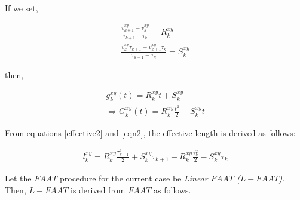 \documentclass[conference]{IEEEtran}
\begin{document}
If we set, 

\begin{eqnarray}
&\frac{v_{k+1}^{xy}-v_k^{xy}}{\tau_{k+1}-\tau_k}=R_k^{xy}&\\
&\frac{v_{k}^{xy}\tau_{k+1}-v_{k+1}^{xy}\tau_{k}}{\tau_{k+1}-\tau_k}=S_k^{xy}&
\end{eqnarray}

then, 

\begin{eqnarray}
&g_k^{xy}(t)=R_k^{xy}t+S_k^{xy}&   \label{eqn1}  \\
&\Rightarrow G_k^{xy}(t)=R_k^{xy}\frac{t^2}{2}+S_k^{xy}t&  \label{eqn2}   
\end{eqnarray}

From equations \ref{effective2} and \ref{eqn2}, the effective length is derived as follows: 

\begin{eqnarray}
&l_k^{xy}=R_k^{xy}\frac{\tau_{k+1}^2}{2}+S_k^{xy}\tau_{k+1}-R_k^{xy}\frac{\tau_{k}^2}{2}-S_k^{xy}\tau_{k}& 
\end{eqnarray}

Let the $FAAT$ procedure for the current case be \emph{Linear $FAAT$ ($L-FAAT$)}. Then, $L-FAAT$ is derived from $FAAT$ as follows.
\end{document}
